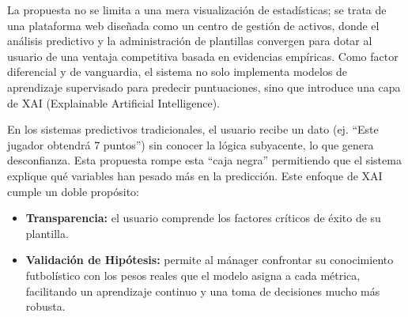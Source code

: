 La propuesta no se limita a una mera visualización de estadísticas; se trata de una plataforma web 
diseñada como un centro de gestión de activos, donde el análisis predictivo y la administración de 
plantillas convergen para dotar al usuario de una ventaja competitiva basada en evidencias empíricas.
Como factor diferencial y de vanguardia, el sistema no solo implementa modelos de aprendizaje 
supervisado para predecir puntuaciones, sino que introduce una capa de XAI (Explainable Artificial 
Intelligence).

En los sistemas predictivos tradicionales, el usuario recibe un dato (ej. ``Este jugador obtendrá 
7 puntos'') sin conocer la lógica subyacente, lo que genera desconfianza.
Esta propuesta rompe esta ``caja negra'' permitiendo que el sistema explique qué variables han 
pesado más en la predicción.
Este enfoque de XAI cumple un doble propósito:

\begin{sloppypar}
\begin{itemize}
\item \textbf{Transparencia:} el usuario comprende los factores críticos de éxito de su plantilla.
\item \textbf{Validación de Hipótesis:} permite al mánager confrontar su conocimiento futbolístico 
con los pesos reales que el modelo asigna a cada métrica, facilitando un aprendizaje continuo y una 
toma de decisiones mucho más robusta.
\end{itemize}
\end{sloppypar}

